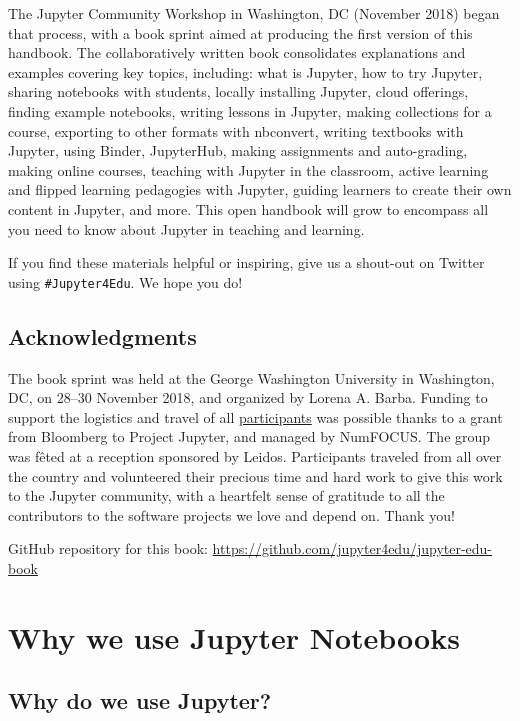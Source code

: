 \documentclass[]{book}
\begin{document}
The Jupyter Community Workshop in Washington, DC (November 2018) began
that process, with a book sprint aimed at producing the first version of
this handbook. The collaboratively written book consolidates
explanations and examples covering key topics, including: what is
Jupyter, how to try Jupyter, sharing notebooks with students, locally
installing Jupyter, cloud offerings, finding example notebooks, writing
lessons in Jupyter, making collections for a course, exporting to other
formats with nbconvert, writing textbooks with Jupyter, using Binder,
JupyterHub, making assignments and auto-grading, making online courses,
teaching with Jupyter in the classroom, active learning and flipped
learning pedagogies with Jupyter, guiding learners to create their own
content in Jupyter, and more. This open handbook will grow to encompass
all you need to know about Jupyter in teaching and learning.

If you find these materials helpful or inspiring, give us a shout-out on
Twitter using \texttt{\#Jupyter4Edu}. We hope you do!

\section*{Acknowledgments}\label{acknowledgments}

The book sprint was held at the George Washington University in
Washington, DC, on 28--30 November 2018, and organized by Lorena A.
Barba. Funding to support the logistics and travel of all
\protect\hyperlink{authors}{participants} was possible thanks to a grant
from Bloomberg to Project Jupyter, and managed by NumFOCUS. The group
was fêted at a reception sponsored by Leidos. Participants traveled from
all over the country and volunteered their precious time and hard work
to give this work to the Jupyter community, with a heartfelt sense of
gratitude to all the contributors to the software projects we love and
depend on. Thank you!

GitHub repository for this book:
\url{https://github.com/jupyter4edu/jupyter-edu-book}

\chapter{Why we use Jupyter
Notebooks}\label{why-we-use-jupyter-notebooks}

\section{Why do we use Jupyter?}\label{why-do-we-use-jupyter}
\end{document}
